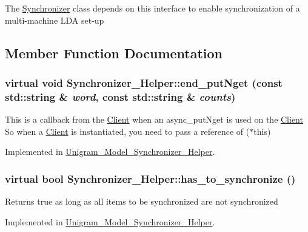 The \hyperlink{class_synchronizer}{Synchronizer} class depends on this interface to enable synchronization of a multi-\/machine LDA set-\/up 

\subsection{Member Function Documentation}
\hypertarget{class_synchronizer___helper_a29ac0b4b630f56e59e6587bb6275d97e}{
\subsubsection[{end\_\-putNget}]{\setlength{\rightskip}{0pt plus 5cm}virtual void Synchronizer\_\-Helper::end\_\-putNget (const std::string \& {\em word}, \/  const std::string \& {\em counts})}}
\label{class_synchronizer___helper_a29ac0b4b630f56e59e6587bb6275d97e}
This is a callback from the \hyperlink{class_client}{Client} when an async\_\-putNget is used on the \hyperlink{class_client}{Client} So when a \hyperlink{class_client}{Client} is instantiated, you need to pass a reference of ($\ast$this) 

Implemented in \hyperlink{class_unigram___model___synchronizer___helper_a07f7982f9ad12c616fef9d3abefe23e1}{Unigram\_\-Model\_\-Synchronizer\_\-Helper}.

\hypertarget{class_synchronizer___helper_a1d9c38f95c9a3a517e5a89659aa4c522}{
\subsubsection[{has\_\-to\_\-synchronize}]{\setlength{\rightskip}{0pt plus 5cm}virtual bool Synchronizer\_\-Helper::has\_\-to\_\-synchronize ()}}
\label{class_synchronizer___helper_a1d9c38f95c9a3a517e5a89659aa4c522}
Returns true as long as all items to be synchronized are not synchronized 

Implemented in \hyperlink{class_unigram___model___synchronizer___helper_ac07d07668ba79d9748d2f52629ccf50e}{Unigram\_\-Model\_\-Synchronizer\_\-Helper}.

